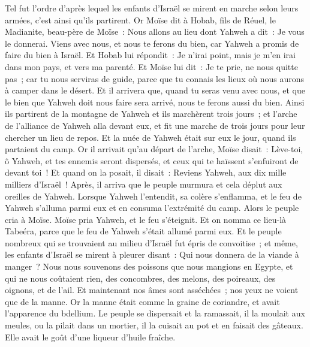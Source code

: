 \begin{multicols}{2}
Tel fut l'ordre d'après lequel les enfants d'Israël se mirent en marche selon leurs armées, c'est ainsi qu'ils partirent.
Or Moïse dit à Hobab, fils de Réuel, le Madianite, beau-père de Moïse~: Nous allons au lieu dont Yahweh a dit~: Je vous le donnerai. Viens avec nous, et nous te ferons du bien, car Yahweh a promis de faire du bien à Israël.
Et Hobab lui répondit~: Je n'irai point, mais je m'en irai dans mon pays, et vers ma parenté.
Et Moïse lui dit~: Je te prie, ne nous quitte pas~; car tu nous serviras de guide, parce que tu connais les lieux où nous aurons à camper dans le désert.
Et il arrivera que, quand tu seras venu avec nous, et que le bien que Yahweh doit nous faire sera arrivé, nous te ferons aussi du bien.
Ainsi ils partirent de la montagne de Yahweh et ils marchèrent trois jours~; et l'arche de l'alliance de Yahweh alla devant eux, et fit une marche de trois jours pour leur chercher un lieu de repos.
Et la nuée de Yahweh était sur eux le jour, quand ils partaient du camp.
Or il arrivait qu'au départ de l'arche, Moïse disait~: Lève-toi, ô Yahweh, et tes ennemis seront dispersés, et ceux qui te haïssent s'enfuiront de devant toi~!
Et quand on la posait, il disait~: Reviens Yahweh, aux dix mille milliers d'Israël~!
\VerseOne{}Après, il arriva que le peuple murmura et cela déplut aux oreilles de Yahweh. Lorsque Yahweh l'entendit, sa colère s'enflamma, et le feu de Yahweh s'alluma parmi eux et en consuma l'extrémité du camp.
Alors le peuple cria à Moïse. Moïse pria Yahweh, et le feu s'éteignit.
Et on nomma ce lieu-là Tabeéra, parce que le feu de Yahweh s'était allumé parmi eux.
Et le peuple nombreux qui se trouvaient au milieu d'Israël fut épris de convoitise~; et même, les enfants d'Israël se mirent à pleurer disant~: Qui nous donnera de la viande à manger~?
Nous nous souvenons des poissons que nous mangions en Egypte, et qui ne nous coûtaient rien, des concombres, des melons, des poireaux, des oignons, et de l'ail.
Et maintenant nos âmes sont asséchées~; nos yeux ne voient que de la manne.
Or la manne était comme la graine de coriandre, et avait l'apparence du bdellium.
Le peuple se dispersait et la ramassait, il la moulait aux meules, ou la pilait dans un mortier, il la cuisait au pot et en faisait des gâteaux. Elle avait le goût d'une liqueur d'huile fraîche.

\end{multicols}

